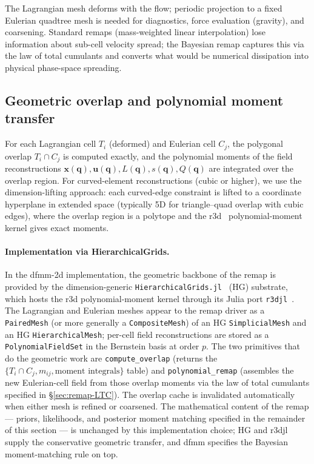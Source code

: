 \documentclass[11pt]{article}
\newcommand{\bx}{\bm{x}}
\newcommand{\bu}{\bm{u}}
\newcommand{\bq}{\bm{q}}
\begin{document}
The Lagrangian mesh deforms with the flow; periodic projection to a
fixed Eulerian quadtree mesh is needed for diagnostics, force
evaluation (gravity), and coarsening. Standard remaps (mass-weighted
linear interpolation) lose information about sub-cell velocity
spread; the Bayesian remap captures this via the law of total
cumulants and converts what would be numerical dissipation into
physical phase-space spreading.

\subsection{Geometric overlap and polynomial moment transfer}
\label{sec:remap-overlap}

For each Lagrangian cell $T_i$ (deformed) and Eulerian cell $C_j$,
the polygonal overlap $T_i\cap C_j$ is computed exactly, and the
polynomial moments of the field reconstructions
$\bx(\bq), \bu(\bq), L(\bq), s(\bq), Q(\bq)$ are integrated over
the overlap region. For curved-element reconstructions (cubic or
higher), we use the dimension-lifting approach: each curved-edge
constraint is lifted to a coordinate hyperplane in extended space
(typically 5D for triangle--quad overlap with cubic edges), where
the overlap region is a polytope and the r3d~\cite{r3d-paper}
polynomial-moment kernel gives exact moments.

\paragraph{Implementation via HierarchicalGrids.}
In the dfmm-2d implementation, the geometric backbone of the remap
is provided by the dimension-generic
\texttt{HierarchicalGrids.jl}~\cite{hg-paper} (HG) substrate, which
hosts the r3d polynomial-moment kernel through its Julia port
\texttt{r3djl}~\cite{r3djl-paper}. The Lagrangian and Eulerian
meshes appear to the remap driver as a \texttt{PairedMesh} (or more
generally a \texttt{CompositeMesh}) of an HG \texttt{SimplicialMesh}
and an HG \texttt{HierarchicalMesh}; per-cell field reconstructions
are stored as a \texttt{PolynomialFieldSet} in the Bernstein basis
at order $p$. The two primitives that do the geometric work are
\texttt{compute\_overlap} (returns the
$\{T_i\cap C_j, m_{ij}, \text{moment integrals}\}$ table) and
\texttt{polynomial\_remap} (assembles the new Eulerian-cell field
from those overlap moments via the law of total cumulants
specified in \S\ref{sec:remap-LTC}). The overlap cache is
invalidated automatically when either mesh is refined or
coarsened. The mathematical content of the remap --- priors,
likelihoods, and posterior moment matching specified in the
remainder of this section --- is unchanged by this implementation
choice; HG and r3djl supply the conservative geometric transfer,
and dfmm specifies the Bayesian moment-matching rule on top.
\end{document}
